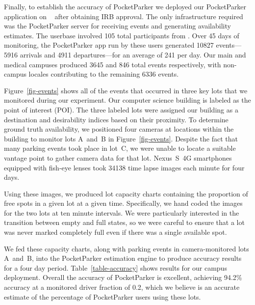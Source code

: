 Finally, to establish the accuracy of PocketParker we deployed our PocketParker
application on \PhoneLab{}~\cite{phonelab-testbed} after obtaining IRB approval. The only
infrastructure required was the PocketParker server for receiving events and
generating availability estimates. The userbase involved 105 total participants
from \PhoneLab{}.  Over 45 days of monitoring, the PocketParker app  run by
these users
generated \num{10827} events---5916 arrivals and 4911 departures---for an
average of 241 per day. Our main and medical campuses produced 3645 and 846
total events respectively, with non-campus locales contributing to the
remaining 6336 events.

Figure~\ref{fig-events} shows all of the events that occurred in three key
lots that we monitored during our experiment. Our computer science building
is labeled as the point of interest (POI). The three labeled lots were
assigned our building as a destination and desirability indices based on
their proximity. To determine ground truth availability, we positioned four
cameras at locations within the building to monitor lots A~and~B in
Figure~\ref{fig-events}. Despite the fact that many parking events took place
in lot~C, we were unable to locate a suitable vantage point to gather camera
data for that lot. Nexus~S~4G smartphones equipped with fish-eye lenses took
\num{34138} time lapse images each minute for four days. 

Using these images, we produced lot capacity charts containing the proportion
of free spots in a given lot at a given time. Specifically, we
hand coded the images for the two lots at ten minute intervals. We were
particularly interested in the transition between empty and full states, so we
were careful to ensure that a lot was never marked completely full even if
there was a single available spot.

We fed these capacity charts, along with parking events in camera-monitored
lots A~and~B, into the PocketParker estimation engine to produce accuracy
results for a four day period.  Table~\ref{table-accuracy} shows results for
our campus deployment. Overall the accuracy of PocketParker is excellent,
achieving 94.2\% accuracy at a monitored driver fraction of 0.2, which we
believe is an accurate estimate of the percentage of PocketParker users using
these lots.

